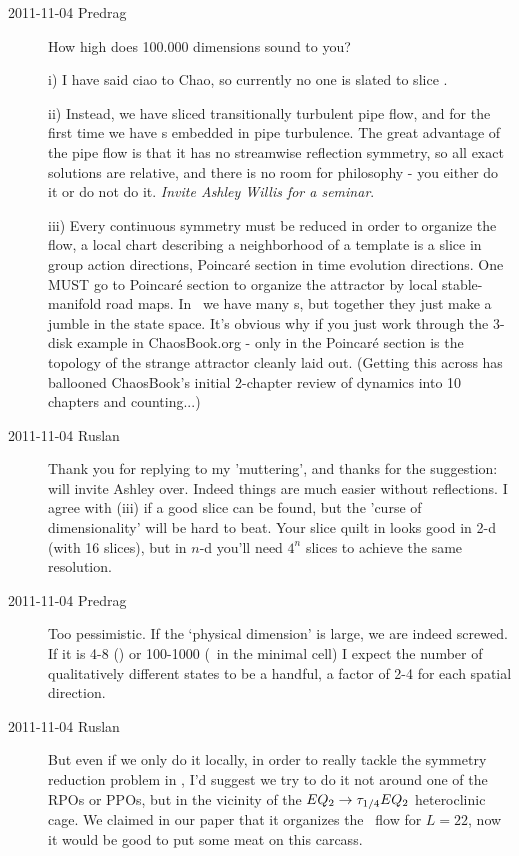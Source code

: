 \begin{description}
\item[2011-11-04 Predrag]              \toCB
How high does 100.000 dimensions sound to you?

i) I have said ciao to Chao, so currently no one is slated to slice
\KS.

ii) Instead, we have sliced transitionally turbulent pipe flow, and
for the first time we have \rpo s embedded in pipe turbulence. The great
advantage of the pipe flow is that it has no streamwise reflection
symmetry, so all exact solutions are relative, and there is no room for
philosophy - you either do it or do not do it. \emph{Invite Ashley Willis
for a seminar}.

iii) Every continuous symmetry must be reduced in order
to organize the flow, a local chart describing a neighborhood of a
template is a slice in group action directions, Poincar\'e section in
time evolution directions. One MUST go to Poincar\'e section to organize
the attractor by local stable-manifold road maps. In \pCf\ we have many
\po s, but together they just make a jumble in the state space. It's obvious
why if you just work through the 3-disk example in ChaosBook.org - only
in the Poincar\'e section is the topology of the strange attractor
cleanly laid out. (Getting this across has ballooned ChaosBook's
initial 2-chapter review of dynamics into 10 chapters and counting...)

\item[2011-11-04 Ruslan] Thank you for replying to my 'muttering', and
thanks for the suggestion: will invite Ashley over.  Indeed things are
much easier without reflections.  I agree with (iii) if a good slice can
be found, but the 'curse of dimensionality' will be hard to beat.  Your
slice quilt in  looks good in 2-d (with 16 slices),
but in $n$-d you'll need $4^n$ slices to achieve the same resolution.

\item[2011-11-04 Predrag] Too pessimistic. If the `physical dimension' is
large, we are indeed screwed. If it is 4-8 (\KS) or 100-1000 (\pCf\ in
the minimal cell) I expect the number of qualitatively different states
to be a handful, a factor of 2-4 for each spatial direction.
%

\item[2011-11-04 Ruslan]
But even if we only do it locally, in order to really tackle the symmetry
reduction problem in \KS, I'd suggest we try to do it not around one of
the RPOs or PPOs, but in the vicinity of the $EQ_{2} \to
\tau_{1/4}EQ_{2}$ heteroclinic cage.  We claimed in our paper that it
organizes the \KS\ flow for $L = 22$, now it would be good to put some
meat on this carcass.


\end{description}
